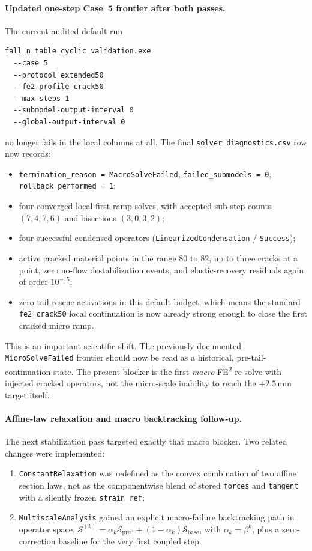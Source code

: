 \paragraph{Updated one-step Case~5 frontier after both passes.}
The current audited default run
\begin{verbatim}
fall_n_table_cyclic_validation.exe
  --case 5
  --protocol extended50
  --fe2-profile crack50
  --max-steps 1
  --submodel-output-interval 0
  --global-output-interval 0
\end{verbatim}
no longer fails in the local columns at all.  The final
\texttt{solver\_diagnostics.csv} row now records:
\begin{itemize}
  \item \texttt{termination\_reason = MacroSolveFailed},
    \texttt{failed\_submodels = 0}, \texttt{rollback\_performed = 1};
  \item four converged local first-ramp solves, with accepted sub-step counts
    \((7,4,7,6)\) and bisections \((3,0,3,2)\);
  \item four successful condensed operators
    (\texttt{LinearizedCondensation} / \texttt{Success});
  \item active cracked material points in the range \(80\) to \(82\),
    up to three cracks at a point, zero no-flow destabilization events,
    and elastic-recovery residuals again of order \(10^{-15}\);
  \item zero tail-rescue activations in this default budget, which means the
    standard \texttt{fe2\_crack50} local continuation is now already strong
    enough to close the first cracked micro ramp.
\end{itemize}

This is an important scientific shift.  The previously documented
\texttt{MicroSolveFailed} frontier should now be read as a historical,
pre-tail-continuation state.  The present blocker is the first \emph{macro}
FE\textsuperscript{2} re-solve with injected cracked operators, not the
micro-scale inability to reach the \(+2.5\)\,mm target itself.

\paragraph{Affine-law relaxation and macro backtracking follow-up.}
The next stabilization pass targeted exactly that macro blocker.  Two related
changes were implemented:
\begin{enumerate}
  \item \texttt{ConstantRelaxation} was redefined as the convex combination of
    two affine section laws, not as the componentwise blend of stored
    \texttt{forces} and \texttt{tangent} with a silently frozen
    \texttt{strain\_ref};
  \item \texttt{MultiscaleAnalysis} gained an explicit macro-failure
    backtracking path in operator space,
    \(\mathcal{S}^{(k)} = \alpha_k \mathcal{S}_{\mathrm{pred}}
      + (1-\alpha_k)\mathcal{S}_{\mathrm{base}}\),
    with \(\alpha_k = \beta^k\), plus a zero-correction baseline for the very
    first coupled step.
\end{enumerate}

